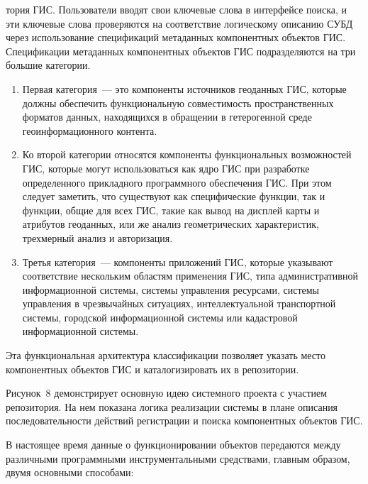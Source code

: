 \begin{multicols}{2}

\noindent
тория ГИС. Пользователи вводят свои ключевые слова в интерфейсе 
поиска, и эти ключевые слова проверяются на соответствие логическому описанию СУБД 
через использование спецификаций метаданных компонентных объектов ГИС. 
Спецификации метаданных компонентных объектов ГИС подразделяются на три большие 
категории. 
\begin{enumerate}[1.]
  \item
 Первая категория~--- это компоненты источников геоданных ГИС, которые 
должны обеспечить функциональную совместимость пространственных форматов 
данных, находящихся в обращении в гетерогенной среде геоинформационного контента. 
\item Ко второй категории относятся компоненты функциональных возможностей ГИС, 
которые\linebreak
 могут использоваться как ядро ГИС при разработке определенного прикладного 
програм\-много обеспечения ГИС. При этом следует заметить, что существуют как 
специфические \mbox{функции}, так и функции, общие для всех ГИС, такие как вывод на дисплей 
карты и атрибутов геоданных, или же анализ геометрических характеристик, трехмерный 
анализ и авторизация. 
\item Третья категория~--- компоненты приложений ГИС, которые 
указывают соответствие нескольким областям применения ГИС, типа административной 
информационной системы, системы управ\-ле\-ния ресурсами, системы управ\-ле\-ния в 
чрезвычайных ситуациях, ин\-тел\-лек\-ту\-аль\-ной транспортной сис\-те\-мы, городской 
информационной системы или кадастровой информационной сис\-темы. 
\end{enumerate}



Эта 
функциональная архитектура классификации позволяет указать место компонентных 
объектов ГИС и каталогизировать их в репозитории. 
      
      Рисунок~8 демонстрирует основную идею сис\-тем\-но\-го проекта с участием 
репозитория. На нем показана логика реализации системы в плане описания 
последовательности действий регистрации и поиска компонентных объектов ГИС.
      
      В настоящее время данные о функционировании объектов передаются между 
различными программными инструментальными средствами, главным образом, двумя 
основными способами:

\end{multicols}

